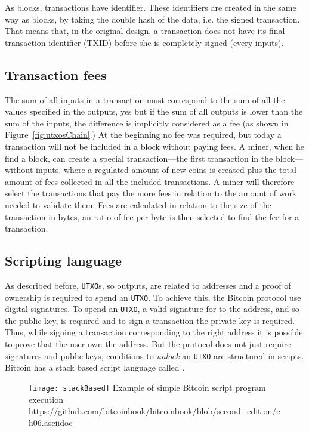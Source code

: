 As blocks, transactions have identifier. These identifiers are created in the same
way as blocks, by taking the double hash of the data, i.e. the signed transaction.
That means that, in the original design, a transaction does not have its final
transaction identifier (TXID) before she is completely signed (every inputs).

\subsection{Transaction fees}

The sum of all inputs in a transaction must correspond to the sum of all the values
specified in the outputs, yes but if the sum of all outputs is lower than the sum
of the inputs, the difference is implicitly considered as a fee (as shown in
Figure~\ref{fig:utxosChain}.) At the beginning no fee was required, but today a
transaction will not be included in a block without paying fees. A miner, when he
find a block, can create a special transaction---the first transaction in the
block---without inputs, where a regulated amount of new coins is created plus the
total amount of fees collected in all the included transactions. A miner will therefore
select the transactions that pay the more fees in relation to the amount of work needed
to validate them. Fees are calculated in relation to the size of the transaction
in bytes, an ratio of fee per byte is then selected to find the fee for a transaction.

\subsection{Scripting language}

As described before, \texttt{UTXO}s, so outputs, are related to addresses and a proof
of ownership is required to spend an \texttt{UTXO}. To achieve this, the Bitcoin
protocol use digital signatures. To spend an \texttt{UTXO}, a valid signature for
to the address, and so the public key, is required and to sign a transaction the
private key is required. Thus, while signing a transaction corresponding to the
right address it is possible to prove that the user own the address. But the
protocol does not just require signatures and public keys, conditions to
\textit{unlock} an \texttt{UTXO} are structured in scripts. Bitcoin has a stack
based script language called .

\begin{figure}[H]
	\centering
	\texttt{[image: stackBased]}
  {Example of simple Bitcoin script program execution}
	{\url{https://github.com/bitcoinbook/bitcoinbook/blob/second_edition/ch06.asciidoc}}
	\label{fig:stackBased}
\end{figure}

